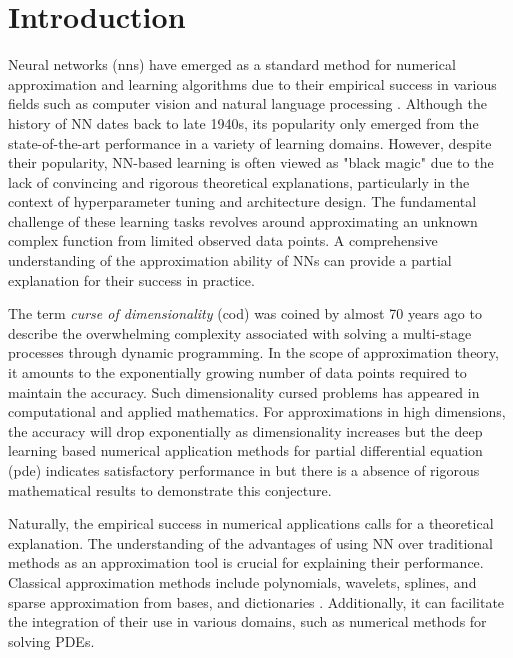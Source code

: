 \chapter{Introduction}
\label{ch:introduction}


Neural networks (\gls{nn}s) have emerged as a standard method for numerical
approximation and learning algorithms due to their empirical success in various
fields such as computer vision and natural language processing
\citep{shalev-shwartzUnderstandingMachineLearning2014}. Although the history of
NN dates back to late 1940s, its popularity only emerged from the
state-of-the-art performance in a variety of learning domains. However, despite
their popularity, NN-based learning is often viewed as "black magic" due to the
lack of convincing and rigorous theoretical explanations, particularly in the
context of hyperparameter tuning and architecture design. The fundamental
challenge of these learning tasks revolves around approximating an unknown
complex function from limited observed data points. A comprehensive
understanding of the approximation ability of NNs can provide a partial
explanation for their success in practice.


The term \textit{curse of dimensionality} (\gls{cod}) was coined by
\cite{bellmanTheoryDynamicProgramming1952} almost 70 years ago to describe the
overwhelming complexity associated with solving a multi-stage processes through
dynamic programming. In the scope of approximation theory, it amounts to the
exponentially growing number of data points required to maintain the accuracy.
Such dimensionality cursed problems has appeared in computational and applied
mathematics. For approximations in high dimensions, the accuracy will drop
exponentially as dimensionality increases but the deep learning based numerical
application methods for partial differential equation (\gls{pde}) indicates
satisfactory performance in \cite{eDeepRitzMethod2017,
eDeepLearningbasedNumerical2017,beckMachineLearningApproximation2019} but there
is a absence of rigorous mathematical results to demonstrate this conjecture.



Naturally, the empirical success in numerical applications calls for a
theoretical explanation. The understanding of the advantages of using NN over
traditional methods as an approximation tool is crucial for explaining their
performance. Classical approximation methods include polynomials, wavelets,
splines, and sparse approximation from bases, and dictionaries
\citep{devore_1998}. Additionally, it can facilitate the integration of their
use in various domains, such as numerical methods for solving PDEs.

